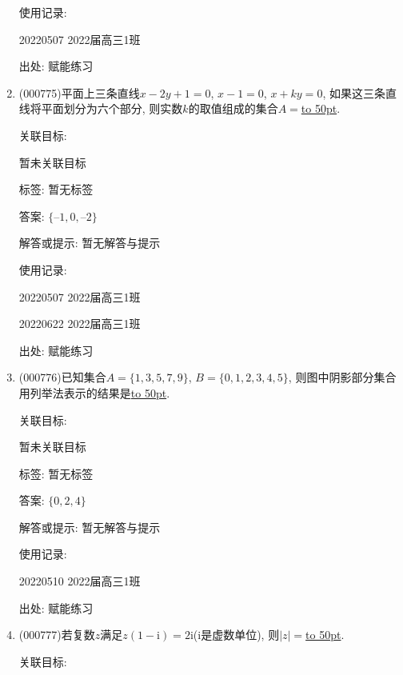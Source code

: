 \documentclass[10pt,a4paper]{article}
\newcommand{\blank}[1]{\underline{\hbox to #1pt{}}}
\begin{document}
\begin{enumerate}[1.]
使用记录:

20220507	2022届高三1班	


出处: 赋能练习
\item { (000775)}平面上三条直线$x-2y+1=0$, $x-1=0$, $x+ky=0$, 如果这三条直线将平面划分为六个部分, 则实数$k$的取值组成的集合$A=$\blank{50}.


关联目标:

暂未关联目标



标签: 暂无标签

答案: $\{–1, 0, –2\}$

解答或提示: 暂无解答与提示

使用记录:

20220507	2022届高三1班	

20220622	2022届高三1班  	


出处: 赋能练习
\item { (000776)}已知集合$A=\{1,3,5,7,9\}$, $B=\{0,1,2,3,4,5\}$, 则图中阴影部分集合用列举法表示的结果是\blank{50}.
\begin{center}
\end{center}


关联目标:

暂未关联目标



标签: 暂无标签

答案: $\{0, 2, 4\}$

解答或提示: 暂无解答与提示

使用记录:

20220510	2022届高三1班	


出处: 赋能练习
\item { (000777)}若复数$z$满足$z(1-\mathrm{i})=2 \mathrm{i}$($\mathrm{i}$是虚数单位), 则$|z|=$\blank{50}.


关联目标:


\end{enumerate}
\end{document}
